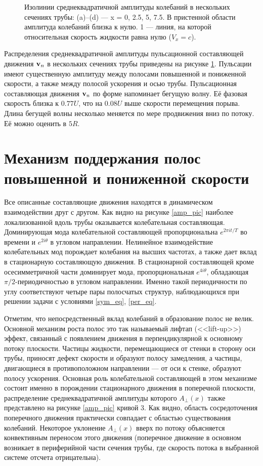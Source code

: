 \begin{figure}[h]
\caption{Изолинии среднеквадратичной амплитуды колебаний в нескольких сечениях трубы: (a)--(d) --- x = 0, 2.5, 5, 7.5. В пристенной области амплитуда колебаний близка к нулю. 1 --- линия, на которой относительная скорость жидкости равна нулю ($V_{x} = c$).}
\label{puls_cs_pic}
\end{figure}

Распределения среднеквадратичной амплитуды пульсационной составляющей движения $\mathbf{v}_n$ в нескольких сечениях трубы приведены на рисунке \ref{puls_cs_pic}. Пульсации имеют существенную амплитуду между полосами повышенной и пониженной скорости, а также между полосой ускорения и осью трубы. Пульсационная составляющая движения $\mathbf{v}_n$ по форме напоминает бегущую волну. Её фазовая скорость близка к $0.77U$, что на $0.08U$ выше скорости перемещения порыва. Длина бегущей волны несколько меняется по мере продвижения вниз по потоку. Её можно оценить в $5R$. 


\section{Механизм поддержания полос повышенной и пониженной скорости} 

Все описанные составляющие движения находятся в динамическом взаимодействии друг с другом. Как видно на рисунке \ref{amp_pic} наиболее локализованной вдоль трубы оказывается колебательная составляющая. Доминирующая мода колебательной составляющей пропорциональна $e^{2\pi it/T}$ во времени и $e^{2i\theta}$ в угловом направлении. Нелинейное взаимодействие колебательных мод порождает колебания на высших частотах, а также дает вклад в стационарную составляющую движения. В стационарной составляющей кроме осесимметричной части доминирует мода, пропорциональная $e^{4i\theta}$, обладающая $\pi/2$-периодичностью в угловом направлении. Именно такой периодичности по углу соответствуют четыре пары полосчатых структур, наблюдающихся при решении задачи с условиями \eqref{sym_eq}, \eqref{per_eq}.

Отметим, что непосредственный вклад колебаний в образование полос не велик. Основной механизм роста полос это так называемый лифтап (<<lift-up>>) эффект, связанный с появлением движения в перпендикулярной к основному потоку плоскости. Частицы жидкости, перемещающиеся от стенки в сторону оси трубы, приносят дефект скорости и образуют полосу замедления, а частицы, двигающиеся в противоположном направлении --- от оси к стенке, образуют полосу ускорения. Основная роль колебательной составляющей в этом механизме состоит именно в порождении стационарного движения в поперечной плоскости, распределение среднеквадратичной амплитуды которого $A_{\perp}(x)$ также представлено на рисунке \ref{amp_pic} кривой 3. Как видно, область сосредоточения поперечного движения практически совпадает с областью существования колебаний. Некоторое уклонение $A_{\perp}(x)$ вверх по потоку объясняется конвективным переносом этого движения (поперечное движение в основном возникает в периферийной части сечения трубы, где скорость потока в выбранной системе отсчета отрицательна).

